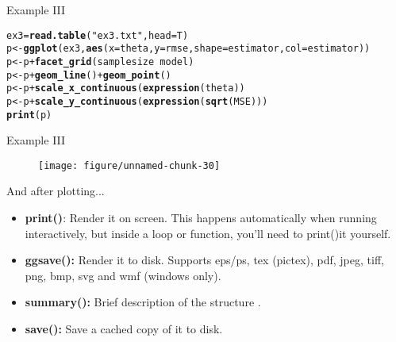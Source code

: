 \documentclass{beamer}\usepackage[]{graphicx}\usepackage[]{color}
\makeatletter
\def\maxwidth{ %
  \ifdim\Gin@nat@width>\linewidth
    \linewidth
  \else
    \Gin@nat@width
  \fi
}
\newcommand{\hlstr}[1]{\textcolor[rgb]{0.192,0.494,0.8}{#1}}%
\newcommand{\hlopt}[1]{\textcolor[rgb]{0,0,0}{#1}}%
\newcommand{\hlstd}[1]{\textcolor[rgb]{0.345,0.345,0.345}{#1}}%
\newcommand{\hlkwb}[1]{\textcolor[rgb]{0.69,0.353,0.396}{#1}}%
\newcommand{\hlkwc}[1]{\textcolor[rgb]{0.333,0.667,0.333}{#1}}%
\newcommand{\hlkwd}[1]{\textcolor[rgb]{0.737,0.353,0.396}{\textbf{#1}}}%
\newenvironment{kframe}{%
 \def\at@end@of@kframe{}%
 \ifinner\ifhmode%
  \def\at@end@of@kframe{\end{minipage}}%
  \begin{minipage}{\columnwidth}%
 \fi\fi%
 \def\FrameCommand##1{\hskip\@totalleftmargin \hskip-\fboxsep
 \colorbox{shadecolor}{##1}\hskip-\fboxsep
     \hskip-\linewidth \hskip-\@totalleftmargin \hskip\columnwidth}%
 \MakeFramed {\advance\hsize-\width
   \@totalleftmargin\z@ \linewidth\hsize
   \@setminipage}}%
 {\par\unskip\endMakeFramed%
 \at@end@of@kframe}
\newenvironment{knitrout}{}{} %
\makeatother
\begin{document}
\begin{frame}[containsverbatim]{Example III}
\begin{small}
\begin{knitrout}\footnotesize
{}\color{fgcolor}\begin{kframe}
\begin{alltt}
\hlstd{ex3}\hlkwb{=}\hlkwd{read.table}\hlstd{(}\hlstr{"ex3.txt"}\hlstd{,}\hlkwc{head}\hlstd{=T)}
\hlstd{p}\hlkwb{<-}\hlkwd{ggplot}\hlstd{(ex3,} \hlkwd{aes}\hlstd{(}\hlkwc{x}\hlstd{=theta,}\hlkwc{y}\hlstd{=rmse,}\hlkwc{shape}\hlstd{=estimator,}\hlkwc{col}\hlstd{=estimator))}
\hlstd{p}\hlkwb{<-}\hlstd{p}\hlopt{+}\hlkwd{facet_grid}\hlstd{(samplesize}\hlopt{~}\hlstd{model)}
\hlstd{p}\hlkwb{<-}\hlstd{p} \hlopt{+}  \hlkwd{geom_line}\hlstd{()} \hlopt{+} \hlkwd{geom_point}\hlstd{()}
\hlstd{p}\hlkwb{<-}\hlstd{p} \hlopt{+} \hlkwd{scale_x_continuous}\hlstd{(}\hlkwd{expression}\hlstd{(theta))}
\hlstd{p}\hlkwb{<-}\hlstd{p}\hlopt{+}\hlkwd{scale_y_continuous}\hlstd{(}\hlkwd{expression}\hlstd{(}\hlkwd{sqrt}\hlstd{(MSE)))}
\hlkwd{print}\hlstd{(p)}
\end{alltt}
\end{kframe}
\end{knitrout}
\end{small}
\end{frame}

\begin{frame}[containsverbatim]{Example III}
\begin{figure}[t]
\centering
\begin{knitrout}\footnotesize
{}\color{fgcolor}
\texttt{[image: figure/unnamed-chunk-30]} 

\end{knitrout}
\end{figure}
\end{frame}

\begin{frame}[containsverbatim]{And after plotting...}

\begin{itemize}
\item \textbf{print()}: Render it on screen. This happens automatically when
running interactively, but inside a loop or function, you'll need to print()it yourself.
\item \textbf{ggsave():} Render it to disk.  Supports eps/ps, tex (pictex), pdf, jpeg, tiff, png, bmp, svg and wmf (windows only).
\item \textbf{summary():} Brief description of the structure .
\item \textbf{save():} Save a cached copy of it to disk.
\end{itemize}
\end{frame}
\end{document}
